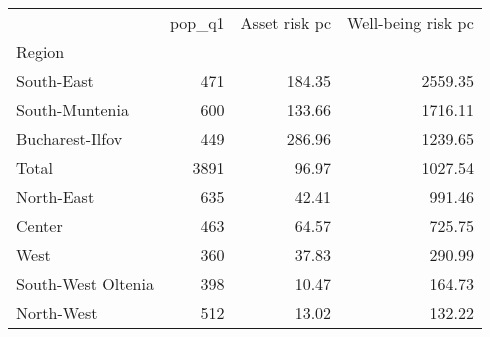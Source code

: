 \begin{tabular}{lrrr}
\toprule
{} &  pop\_q1 &  Asset risk pc &  Well-being risk pc \\
Region             &         &                &                     \\
\midrule
South-East         &     471 &         184.35 &             2559.35 \\
South-Muntenia     &     600 &         133.66 &             1716.11 \\
Bucharest-Ilfov    &     449 &         286.96 &             1239.65 \\
Total              &    3891 &          96.97 &             1027.54 \\
North-East         &     635 &          42.41 &              991.46 \\
Center             &     463 &          64.57 &              725.75 \\
West               &     360 &          37.83 &              290.99 \\
South-West Oltenia &     398 &          10.47 &              164.73 \\
North-West         &     512 &          13.02 &              132.22 \\
\bottomrule
\end{tabular}
